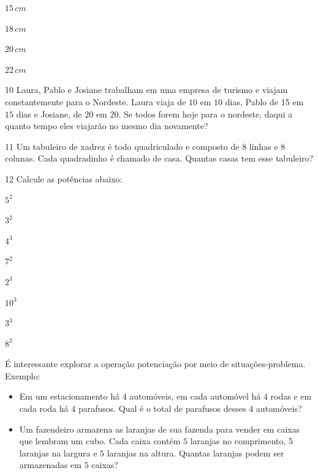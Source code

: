 \begin{escolha}
\item $15\,cm$ \reduline{\hfill}
\item $18\,cm$ \reduline{\hfill}
\item $20\,cm$ \reduline{\hfill}
\item $22\,cm$ 
\end{escolha}

\num{10} Laura, Pablo e Josiane trabalham em uma empresa de turismo e viajam
constantemente para o Nordeste. Laura viaja de $10$ em $10$ dias, Pablo de
15 em $15$ dias e Josiane, de $20$ em $20$. Se todos forem hoje para o
nordeste, daqui a quanto tempo eles viajarão no mesmo dia novamente?


\num{11} Um tabuleiro de xadrez é todo quadriculado e composto de $8$ linhas e
$8$ colunas. Cada quadradinho é chamado de casa. Quantas casas tem esse
tabuleiro?



\num{12} Calcule as potências abaixo:

\begin{escolha}
\item $5^2$ 
\item $3^2$ 
\item $4^3$ 
\item $7^2$ 
\item $2^3$ 
\item $10^3$ 
\item $3^3$ 
\item $8^2$ 
\end{escolha}

\noindent É interessante explorar a operação potenciação por meio de
situações-problema. Exemplo:

\begin{itemize}
\item Em um estacionamento há $4$ automóveis, em cada automóvel há $4$ rodas e
em cada roda há $4$ parafusos. Qual é o total de parafusos desses $4$
automóveis?

\item Um fazendeiro armazena as laranjas de sua fazenda para vender em
caixas que lembram um cubo. Cada caixa contém $5$ laranjas no comprimento,
5 laranjas na largura e $5$ laranjas na altura. Quantas laranjas podem ser
armazenadas em $5$ caixas?
\end{itemize}

